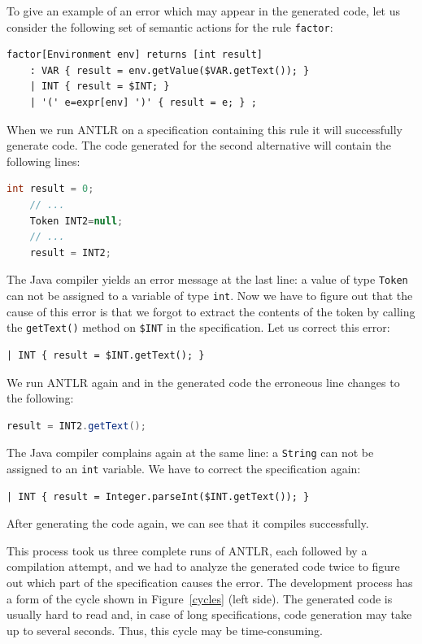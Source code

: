 \documentclass{llncs2e/llncs}
\newcommand{\figref}[1]{Figure~\ref{#1}}
\newcommand{\tool}[1]{\textsc{#1}}
\begin{document}
To give an example of an error which may appear in the generated code, let us consider the following set of semantic actions for the rule \texttt{factor}:
\begin{lstlisting}[language=ANTLR]
factor[Environment env] returns [int result]
	: VAR { result = env.getValue($VAR.getText()); }
	| INT { result = $INT; }
	| '(' e=expr[env] ')' { result = e; } ;
\end{lstlisting}
When we run \tool{ANTLR} on a specification containing this rule it will successfully generate code. The code generated for the second alternative will contain the following lines:
\begin{lstlisting}[language=Java,escapechar={!}]
	int result = 0;
	// ...
	Token INT2=null;
	// ...
	result = INT2;
\end{lstlisting}
The Java compiler yields an error message at the last line: a value of type \texttt{Token} can not be assigned to a variable of type \texttt{int}. Now we have to figure out that the cause of this error is that we forgot to extract the contents of the token by calling the \texttt{getText()} method on \texttt{\$INT} in the specification. Let us correct this error:
\begin{lstlisting}[language=ANTLR]
	| INT { result = $INT.getText(); }
\end{lstlisting}
We run \tool{ANTLR} again and in the generated code the erroneous line changes to the following:
\begin{lstlisting}[language=Java]
	result = INT2.getText();
\end{lstlisting}
The Java compiler complains again at the same line: a \texttt{String} can not be assigned to an \texttt{int} variable. We have to correct the specification again:
\begin{lstlisting}[language=ANTLR]
	| INT { result = Integer.parseInt($INT.getText()); }
\end{lstlisting}
After generating the code again, we can see that it compiles successfully. 

This process took us three complete runs of \tool{ANTLR}, each followed by a compilation attempt, and we had to analyze the generated code twice to figure out which part of the specification causes the error. The development process has a form of the cycle shown in \figref{cycles} (left side). The generated code is usually hard to read and, in case of long specifications, code generation may take up to several seconds. Thus, this cycle may be time-consuming. 
\end{document}
